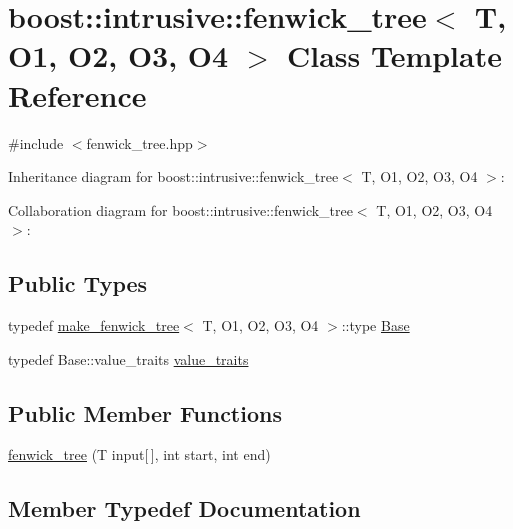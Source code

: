 \hypertarget{classboost_1_1intrusive_1_1fenwick__tree}{}\section{boost\+:\+:intrusive\+:\+:fenwick\+\_\+tree$<$ T, O1, O2, O3, O4 $>$ Class Template Reference}
\label{classboost_1_1intrusive_1_1fenwick__tree}


{\ttfamily \#include $<$fenwick\+\_\+tree.\+hpp$>$}



Inheritance diagram for boost\+:\+:intrusive\+:\+:fenwick\+\_\+tree$<$ T, O1, O2, O3, O4 $>$\+:


Collaboration diagram for boost\+:\+:intrusive\+:\+:fenwick\+\_\+tree$<$ T, O1, O2, O3, O4 $>$\+:
\subsection*{Public Types}
\begin{DoxyCompactItemize}
\item 
typedef \hyperlink{structboost_1_1intrusive_1_1make__fenwick__tree}{make\+\_\+fenwick\+\_\+tree}$<$ T, O1, O2, O3, O4 $>$\+::type \hyperlink{classboost_1_1intrusive_1_1fenwick__tree_a1ea48121b592add95278c215771b0f96}{Base}
\item 
typedef Base\+::value\+\_\+traits \hyperlink{classboost_1_1intrusive_1_1fenwick__tree_aa7fcc6f3fabb763e2aed47bc0f0a073c}{value\+\_\+traits}
\end{DoxyCompactItemize}
\subsection*{Public Member Functions}
\begin{DoxyCompactItemize}
\item 
\hyperlink{classboost_1_1intrusive_1_1fenwick__tree_a81e92c61c222ef9e6b3bec3a11d6b177}{fenwick\+\_\+tree} (T input\mbox{[}$\,$\mbox{]}, int start, int end)
\end{DoxyCompactItemize}


\subsection{Member Typedef Documentation}
\mbox{\label{classboost_1_1intrusive_1_1fenwick__tree_a1ea48121b592add95278c215771b0f96}} 
